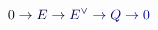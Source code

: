 \documentclass[12pt]{article}
\begin{document}
\makeatletter
\renewcommand*{\@textcolor}[3]{%
  \protect\leavevmode
  \begingroup
    \color#1{#2}#3%
  \endgroup
}
\makeatother
\begin{displaymath}
\mathcolor[RGB]{0,0,15}{0} \mathcolor[RGB]{0,0,30}{\to} \mathcolor[RGB]{0,0,45}{E} \mathcolor[RGB]{0,0,60}{\to} \mathcolor[RGB]{0,0,75}{E} ^ { \mathcolor[RGB]{0,0,90}{\vee} } \mathcolor[RGB]{0,0,105}{\to} \mathcolor[RGB]{0,0,120}{Q} \mathcolor[RGB]{0,0,135}{\to} \mathcolor[RGB]{0,0,150}{0}
\end{displaymath}
\end{document}
